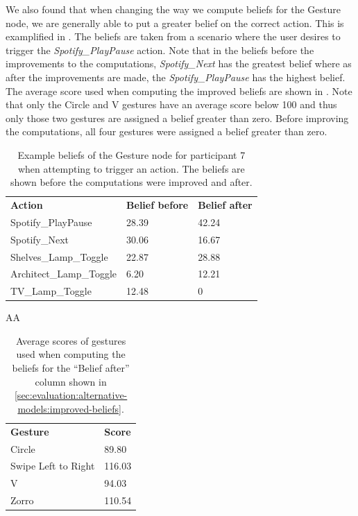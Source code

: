 We also found that when changing the way we compute beliefs for the Gesture node, we are generally able to put a greater belief on the correct action. This is examplified in . The beliefs are taken from a scenario where the user desires to trigger the \emph{Spotify\_PlayPause} action. Note that in the beliefs before the improvements to the computations, \emph{Spotify\_Next} has the greatest belief where as after the improvements are made, the \emph{Spotify\_PlayPause} has the highest belief.
The average score used when computing the improved beliefs are shown in . Note that only the Circle and V gestures have an average score below 100 and thus only those two gestures are assigned a belief greater than zero. Before improving the computations, all four gestures were assigned a belief greater than zero.

\begin{table}[]
\centering
\caption{Example beliefs of the Gesture node for participant 7 when attempting to trigger an action. The beliefs are shown before the computations were improved and after.}
\label{sec:evaluation:alternative-models:improved-action-beliefs}
\begin{tabular}{lll}
\textbf{Action}         & \textbf{Belief before} & \textbf{Belief after} \\
Spotify\_PlayPause      & 28.39                                              & 42.24                                             \\
Spotify\_Next           & 30.06                                              & 16.67                                             \\
Shelves\_Lamp\_Toggle   & 22.87                                              & 28.88                                             \\
Architect\_Lamp\_Toggle & 6.20                                               & 12.21                                             \\
TV\_Lamp\_Toggle        & 12.48                                              & 0                                                 
\end{tabular}
\end{table}

\begin{table}[]
\centering
AA\caption{Average scores of gestures used when computing the beliefs for the ``Belief after'' column shown in \cref{sec:evaluation:alternative-models:improved-beliefs}.}
\label{sec:evaluation:alternative-models:improved-gesture-beliefs}
\begin{tabular}{ll}
\textbf{Gesture}    & \textbf{Score} \\
Circle              & 89.80          \\
Swipe Left to Right & 116.03         \\
V                   & 94.03          \\
Zorro               & 110.54         
\end{tabular}
\end{table}

